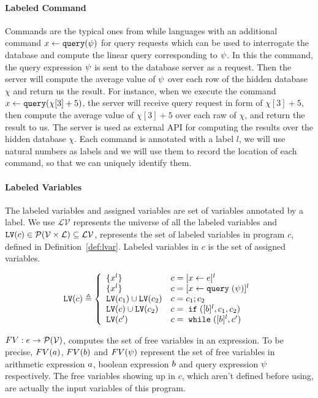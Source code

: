 \paragraph{Labeled Command}
Commands are the typical ones from while languages with an additional command $\mathrel{ x \leftarrow {\tt query}(\psi) }$ 
for query requests which can be used to interrogate the database and compute the linear query corresponding to $\psi$.
In this the command, the query expression $\psi$ is sent to the database server as a request.
Then the server will compute the average value of $\psi$ over each row of the hidden database $\chi$ and return us the result.
For instance, when we execute the command $\mathrel{ x \leftarrow {\tt query}(\chi[3] + 5) }$,
the server will receive query request in form of $\chi[3] + 5$,
then compute the average value of $\chi[3] + 5$ over each raw of $\chi$, and return the result to us. 
The server is used as external API for computing the results over the hidden database $\chi$.
Each command is annotated with a label $l$, we will use natural numbers as labels and we will use them to record
the location of each command, so that we can uniquely identify them.


 
\paragraph{Labeled Variables}
The labeled variables and assigned variables are set of variables annotated by a label. 
We use  
$\mathcal{LV}$ represents the universe of all the labeled variables and 
$\mathtt{LV}(c) \in \mathcal{P}(\mathcal{V} \times \mathcal{L}) \subseteq \mathcal{LV}$,
represents the set of labeled variables in program $c$,
defined in Definition~\ref{def:lvar}.
Labeled variables in $c$ is the set of assigned variables.
%
%
\begin{defn}
  \label{def:lvar}
  {
  $$
    \lvar(c) \triangleq
    \left\{
    \begin{array}{ll}
        \{{x}^l\}           
        & {c} = [{\assign x e}]^{l} 
        \\
        \{{x}^l\}            
        & {c} = [{\assign x \query(\qexpr)}]^{l} 
        \\
        \lvar(c_1) \cup \lvar(c_2) 
        & {c} = {c_1};{c_2}
        \\
        \lvar(c) \cup \lvar(c_2)
        & {c} =\eif([\bexpr]^{l}, c_1, c_2) 
        \\
        \lvar(c')
        & {c}   = \ewhile ([\bexpr]^{l}, {c}')
  \end{array}
  \right.
  $$
  }
  \end{defn}
  $FV: e \to \mathcal{P}(\mathcal{V})$, computes the set of free variables in an expression. To be precise,
  $FV(a)$, $FV(b)$ and $FV(\psi)$ represent the set of free variables in arithmetic
  expression $a$, boolean expression $b$ and query expression $\psi$ respectively.
  The free variables
  showing up in $c$, which aren't defined before using, are actually the input variables of this program.
  
